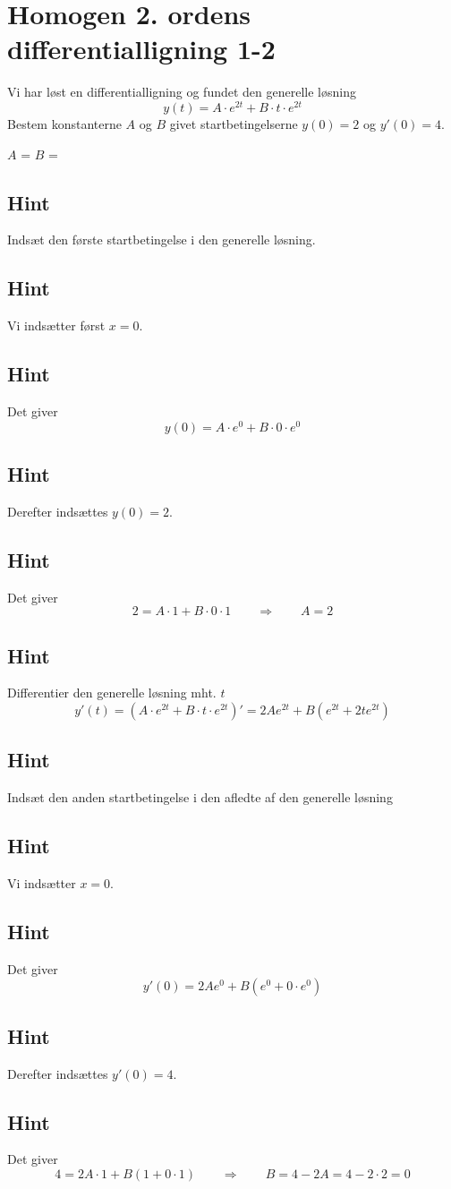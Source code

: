 \documentclass{article}
\newenvironment{exercise}[1]{\newpage\section{#1}}{}
\newcommand{\answerbox}[1]{\fbox{$#1$}}
\newcommand{\hint}{\subsection*{Hint}}
\begin{document}
\begin{exercise}{Homogen 2. ordens differentialligning 1-2}
	
	Vi har løst en differentialligning og fundet den generelle løsning
	\[
	y(t) = A \cdot e^{2t} + B \cdot t \cdot e^{2t}
	\]
	Bestem konstanterne $A$ og $B$ givet startbetingelserne $y(0)=2$ og $y'(0)=4$.
	
	
	$A$ = \answerbox{2}		
$B$ = \answerbox{0}
	
	\hint
	
	Indsæt den første startbetingelse i den generelle løsning. 
	
	
	\hint
	
	Vi indsætter først $x=0$.
	
	\hint
	
	Det giver
	\[
	y(0)=  A \cdot e^{0} + B \cdot 0 \cdot e^{0}
	\]
	
	\hint
	
	Derefter indsættes $y(0)=2$.
	
	\hint 
	
	Det giver 
	\[
	2 = A \cdot 1 + B \cdot 0 \cdot 1 \qquad \Rightarrow \qquad A = 2
	\]
	
	\hint 
	
	Differentier den generelle løsning mht. $t$
	\[
	y'(t)= \left(A \cdot e^{2t} + B \cdot t \cdot e^{2t} \right)' = 2A e^{2t} + B \left( e^{2t} +2 t e^{2t} \right)
	\]
	
	\hint 
	
	Indsæt den anden startbetingelse i den afledte af den generelle løsning
	
	\hint
	
	Vi indsætter $x=0$.
	
	\hint 
	
	Det giver
	\[
	y'(0) = 2A e^{0} + B \left( e^{0} + 0 \cdot e^{0} \right)
	\]
	
	\hint 
	
	Derefter indsættes $y'(0)=4$.
	
	\hint
	
	Det giver
	\[
	4 = 2A \cdot 1 + B \left(1 + 0 \cdot 1 \right) \qquad \Rightarrow \qquad B = 4 - 2A = 4 - 2 \cdot 2 = 0
	\]
	
	
\end{exercise}

\newpage
\end{document}
